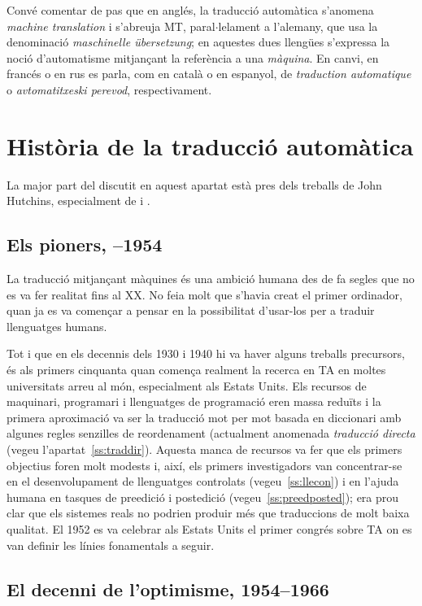 Convé comentar de pas que en anglés, la traducció automàtica
s'anomena \emph{machine translation} i s'abreuja MT, paral$\cdot$lelament a
l'alemany, que usa la denominació \emph{maschinelle
  übersetzung}; en  aquestes dues llengües s'expressa la
noció d'automatisme mitjançant la referència a una {\em
  màquina}. En
canvi, en francés o en rus es parla, com en català o en espanyol, de {\em
traduction automatique} o \emph{avtomatitxeski perevod},
respectivament.  


\section{Història de la traducció automàtica}

La major part del discutit en aquest apartat està pres dels treballs
de John Hutchins, especialment de \cite{hutchins1995}
i \cite{hutchins2001}.

\subsection{Els pioners, --1954}

La traducció mitjançant màquines és una ambició humana des de fa
segles que no es va fer 
realitat fins al XX. No feia molt que s'havia creat el primer
ordinador, 
quan ja es va 
començar a pensar en la possibilitat d'usar-los
per a traduir llenguatges 
humans. 

Tot i que en els decennis dels 1930 i 1940 
hi va haver alguns treballs precursors,
és als primers cinquanta quan comença realment la recerca en TA en moltes 
universitats arreu al món, especialment als 
Estats Units. Els recursos de maquinari, programari i 
llenguatges de programació eren massa
reduïts i la primera aproximació va ser la traducció 
mot per mot 
basada en diccionari amb algunes regles 
senzilles de reordenament (actualment anomenada \emph{traducció
  directa} (vegeu l'apartat~\ref{ss:traddir}). Aquesta manca
de recursos va fer que els primers objectius foren
molt modests i, així, els primers investigadors van concentrar-se
en el desenvolupament de llenguatges 
controlats (vegeu~\ref{ss:llecon}) i 
en l'ajuda humana en tasques de preedició i postedició 
(vegeu~\ref{ss:preedposted}); 
era prou clar
que els sistemes reals no podrien produir 
més que traduccions de molt baixa qualitat. 
El 1952 es va celebrar als Estats Units 
el primer 
congrés sobre TA on es van definir les línies fonamentals a seguir.

\subsection{El decenni de l'optimisme, 1954--1966}

